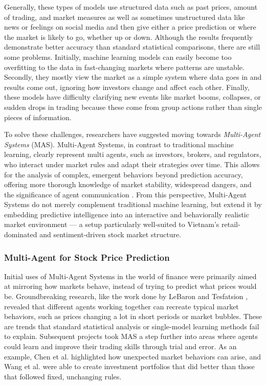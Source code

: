 \documentclass{ieeeaccess}
\begin{document}
Generally, these types of models use structured data such as past prices, amount of trading, and market measures as well as sometimes unstructured data like news or feelings on social media and then give either a price prediction or where the market is likely to go, whether up or down. Although the results frequently demonstrate better accuracy than standard statistical comparisons, there are still some problems. Initially, machine learning models can easily become too overfitting to the data in fast-changing markets where patterns are unstable. Secondly, they mostly view the market as a simple system where data goes in and results come out, ignoring how investors change and affect each other. Finally, these models have difficulty clarifying new events like market booms, collapses, or sudden drops in trading because these come from group actions rather than single pieces of information.

To solve these challenges, researchers have suggested moving towards \textit{Multi-Agent Systems} (MAS). Multi-Agent Systems, in contrast to traditional machine learning, clearly represent multi agents, such as investors, brokers, and regulators, who interact under market rules and adapt their strategies over time. This allows for the analysis of complex, emergent behaviors beyond prediction accuracy, offering more thorough knowledge of market stability, widespread dangers, and the significance of agent communication \cite{lebaron2006,chen2012,tesfatsion2006,wang2021}. From this perspective, Multi-Agent Systems do not merely complement traditional machine learning, but extend it by embedding predictive intelligence into an interactive and behaviorally realistic market environment — a setup particularly well-suited to Vietnam’s retail-dominated and sentiment-driven stock market structure.

\subsubsection{Multi-Agent for Stock Price Prediction}
Initial uses of Multi-Agent Systems in the world of finance were primarily aimed at mirroring how markets behave, instead of trying to predict what prices would be. Groundbreaking research, like the work done by LeBaron \cite{lebaron2006} and Tesfatsion \cite{tesfatsion2006}, revealed that different agents working together can recreate typical market behaviors, such as prices changing a lot in short periods or market bubbles. These are trends that standard statistical analysis or single-model learning methods fail to explain.
Subsequent projects took MAS a step further into areas where agents could learn and improve their trading skills through trial and error. As an example, Chen et al. \cite{chen2012} highlighted how unexpected market behaviors can arise, and Wang et al. \cite{wang2021} were able to create investment portfolios that did better than those that followed fixed, unchanging rules.
\end{document}

